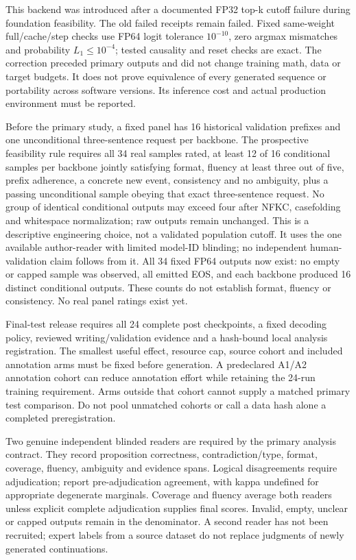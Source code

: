 This backend was introduced after a documented FP32 top-k cutoff failure during
foundation feasibility. The old failed receipts remain failed. Fixed
same-weight full/cache/step checks use FP64 logit tolerance $10^{-10}$,
zero argmax mismatches and probability $L_1\leq10^{-4}$; tested causality and
reset checks are exact. The correction preceded primary outputs and did not
change training math, data or target budgets. It does not prove equivalence of
every generated sequence or portability across software versions. Its inference
cost and actual production environment must be reported.

Before the primary study, a fixed panel has 16 historical validation prefixes
and one unconditional three-sentence request per backbone. The prospective feasibility rule
requires all 34 real samples rated, at least 12 of 16 conditional samples per
backbone jointly satisfying format, fluency at least three out of five, prefix
adherence, a concrete new event, consistency and no ambiguity, plus a passing
unconditional sample obeying that exact three-sentence request. No group of
identical conditional outputs may exceed four after NFKC, casefolding and
whitespace normalization; raw outputs remain unchanged.
This is a descriptive engineering choice, not a validated population cutoff.
It uses the one available author-reader with limited model-ID blinding;
no independent human-validation claim follows from it. All 34 fixed FP64
outputs now exist: no empty or capped sample was observed, all emitted EOS,
and each backbone produced 16 distinct conditional outputs. These counts do
not establish format, fluency or consistency. No real panel ratings exist yet.

Final-test release requires all 24 complete post checkpoints, a fixed decoding
policy, reviewed writing/validation evidence and a hash-bound local analysis
registration. The smallest useful effect, resource cap, source cohort and
included annotation arms must be fixed before generation. A predeclared A1/A2
annotation cohort can reduce annotation effort while retaining the 24-run
training requirement. Arms outside that cohort cannot supply a matched primary
test comparison. Do not pool unmatched cohorts or call a data hash alone a
completed preregistration.

Two genuine independent blinded readers are required by the primary analysis
contract. They record proposition correctness, contradiction/type, format,
coverage, fluency, ambiguity and evidence spans. Logical disagreements require
adjudication; report pre-adjudication agreement, with kappa undefined for
appropriate degenerate marginals. Coverage and fluency average both readers
unless explicit complete adjudication supplies final scores. Invalid, empty,
unclear or capped outputs remain in the denominator. A second reader has not
been recruited; expert labels from a source dataset do not replace judgments
of newly generated continuations.

